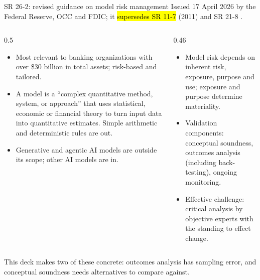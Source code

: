\documentclass[aspectratio=169,10pt]{beamer}
\begin{document}
\begin{frame}{SR 26-2: revised guidance on model risk management}
  \small
  Issued 17 April 2026 by the Federal Reserve, OCC and FDIC; it \hl{supersedes SR 11-7} (2011) and SR 21-8 \citep{fed2026sr262}.
  \begin{columns}[T]
    \begin{column}{0.5\textwidth}
      \begin{itemize}
        \item Most relevant to banking organizations with over \$30 billion in total assets; risk-based and tailored.
        \item A model is a ``complex quantitative method, system, or approach'' that uses statistical, economic or financial theory to turn input data into quantitative estimates. Simple arithmetic and deterministic rules are out.
        \item Generative and agentic AI models are outside its scope; other AI models are in.
      \end{itemize}
    \end{column}
    \begin{column}{0.46\textwidth}
      \begin{itemize}
        \item Model risk depends on inherent risk, exposure, purpose and use; exposure and purpose determine materiality.
        \item Validation components: conceptual soundness, outcomes analysis (including back-testing), ongoing monitoring.
        \item Effective challenge: critical analysis by objective experts with the standing to effect change.
      \end{itemize}
    \end{column}
  \end{columns}
  \vspace{0.3em}
  This deck makes two of these concrete: outcomes analysis has sampling error, and conceptual soundness needs alternatives to compare against.
\end{frame}
\end{document}
